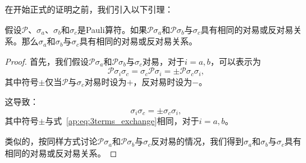 在开始正式的证明之前，我们引入以下引理： 
\begin{lemma}\label{ap:lemma:3terms_exchange} 
    假设$\mathcal{P}$、$\sigma_a$、$\sigma_b$和$\sigma_c$是Pauli算符。如果$\mathcal{P}\sigma_a$和$\mathcal{P}\sigma_b$与$\sigma_c$具有相同的对易或反对易关系。那么$\sigma_a$和$\sigma_b$与$\sigma_c$具有相同的对易或反对易关系。

\begin{proof}
    首先，我们假设$\mathcal{P}\sigma_a$和$\mathcal{P}\sigma_b$与$\sigma_c$对易，对于$i=a,b$，可以表示为
    \begin{equation}\label{ap:eq:3terms_exchange}
        \mathcal{P}\sigma_i\sigma_c=\sigma_c\mathcal{P}\sigma_i=\pm\mathcal{P}\sigma_c\sigma_i,
    \end{equation}
    其中符号$\pm$仅当$\mathcal{P}$与$\sigma_c$对易时设为$+$，反对易时设为$-$。
    
    这导致：
    \begin{equation}
    \sigma_i\sigma_c=\pm\sigma_c\sigma_i,
    \end{equation}
    其中符号$\pm$与式~\eqref{ap:eq:3terms_exchange}相同，对于$i=a,b$。

    类似的，按同样方式讨论$\mathcal{P}\sigma_a$和$\mathcal{P}\sigma_b$与$\sigma_c$反对易的情况，我们得到$\sigma_a$和$\sigma_b$与$\sigma_c$具有相同的对易或反对易关系。
\end{proof}

\end{lemma}

